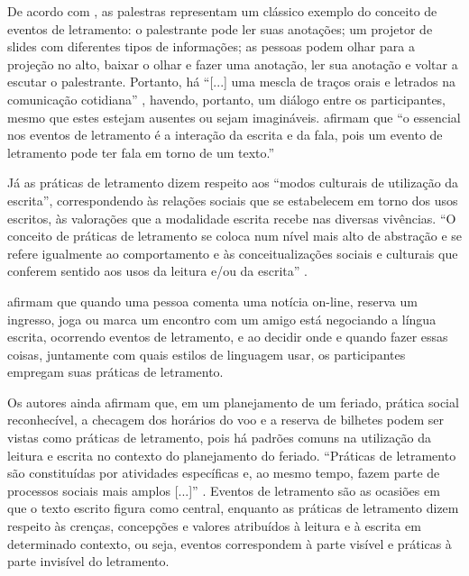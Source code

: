 \documentclass{textolivre}
\begin{document}
De acordo com \textcite{street2014}, as palestras representam um clássico
exemplo do conceito de eventos de letramento: o palestrante pode ler suas
anotações; um projetor de slides com diferentes tipos de informações; as
pessoas podem olhar para a projeção no alto, baixar o olhar e fazer uma
anotação, ler sua anotação e voltar a escutar o palestrante. Portanto, há
“[...] uma mescla de traços orais e letrados na comunicação cotidiana” \textcite[p. 146]{street2014},
havendo, portanto, um diálogo entre os participantes, mesmo que
estes estejam ausentes ou sejam imagináveis. \textcite[p. 25]{barton2015} afirmam
que “o essencial nos eventos de letramento é a interação da escrita e da fala,
pois um evento de letramento pode ter fala em torno de um texto.”

Já as práticas de letramento dizem respeito aos “modos culturais de utilização
da escrita”, correspondendo às relações sociais que se estabelecem em torno dos
usos escritos, às valorações que a modalidade escrita recebe nas diversas
vivências. “O conceito de práticas de letramento se coloca num nível mais alto
de abstração e se refere igualmente ao comportamento e às conceitualizações
sociais e culturais que conferem sentido aos usos da leitura e/ou da escrita”
\cite[p. 18]{street2014}.

\textcite{barton2015} afirmam que quando uma pessoa comenta uma notícia
on-line, reserva um ingresso, joga ou marca um encontro com um amigo está
negociando a língua escrita, ocorrendo eventos de letramento, e ao decidir onde
e quando fazer essas coisas, juntamente com quais estilos de linguagem usar, os
participantes empregam suas práticas de letramento.

Os autores ainda afirmam que, em um planejamento de um feriado, prática social
reconhecível, a checagem dos horários do voo e a reserva de bilhetes podem ser
vistas como práticas de letramento, pois há padrões comuns na utilização da
leitura e escrita no contexto do planejamento do feriado. “Práticas de
letramento são constituídas por atividades específicas e, ao mesmo tempo, fazem
parte de processos sociais mais amplos [...]” \cite[p. 40]{barton2015}.
Eventos de letramento são as ocasiões em que o texto escrito figura como
central, enquanto as práticas de letramento dizem respeito às crenças,
concepções e valores atribuídos à leitura e à escrita em determinado contexto,
ou seja, eventos correspondem à parte visível e práticas à parte invisível do
letramento.
\end{document}
